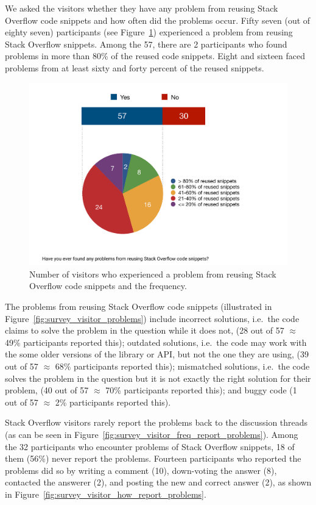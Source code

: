 \documentclass{svjour3}                     %
\begin{document}
We asked the visitors whether they have any problem from reusing Stack Overflow
code snippets and how often did the problems occur.  Fifty seven (out of eighty
seven) participants (see Figure~\ref{fig:survey_v_problems}) experienced a
problem from reusing Stack Overflow snippets. Among the 57, there are 2
participants who found problems in more than 80\% of the reused code snippets.
Eight and sixteen faced problems from at least sixty and forty percent of the
reused snippets.


\begin{figure} \centering
	\includegraphics[width=.4\linewidth]{survey_v_problems} 
	\caption{Number of visitors who experienced a problem from reusing Stack Overflow code snippets and the frequency.}
	\label{fig:survey_v_problems} 
\end{figure}

The problems from reusing Stack Overflow code snippets (illustrated in
Figure~\ref{fig:survey_visitor_problems}) include incorrect solutions, i.e.~the
code claims to solve the problem in the question while it does not,  (28 out of
57 $\approx$ 49\% participants reported this); outdated solutions, i.e.~the code
may work with the some older versions of the library or API, but not the one
they are using, (39 out of 57 $\approx$ 68\% participants reported this);
mismatched solutions, i.e.~the code solves the problem in the question but it is
not exactly the right solution for their problem, (40 out of 57 $\approx$ 70\%
participants reported this); and buggy code (1 out of 57 $\approx$ 2\%
participants reported this).

Stack Overflow visitors rarely report the problems back to the discussion
threads (as can be seen in
Figure~\ref{fig:survey_visitor_freq_report_problems}). Among the 32 participants
who encounter problems of Stack Overflow snippets, 18 of them (56\%) never
report the problems. Fourteen participants who reported the problems
did so by writing a comment (10), down-voting the answer (8), contacted the
answerer (2), and posting the new and correct answer (2), as shown in
Figure~\ref{fig:survey_visitor_how_report_problems}.
\end{document}
